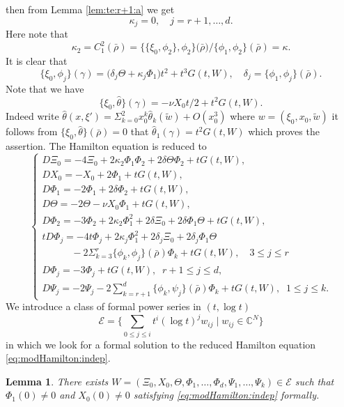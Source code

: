 \documentclass[12pt,leqno]{article} %
\def\ga{\gamma}
\def\C{{\mathbb C}}
\def\bro{\bar\rho}
\def\C{\mathbb{C}}
\def\bro{\bar\rho}
\numberwithin{equation}{section}
\newtheorem{lem}{Lemma}[section]
\begin{document}
then from Lemma \ref{lem:te:r+1:a} we get
%
\begin{equation}
\label{eq:yakobi:2:bis}
\kappa_j=0,\quad j=r+1,\ldots,d.
\end{equation}
%
Here note that 
%
\begin{equation}
\label{eq:kazehiki}
\kappa_2=C_1^2({\bar\rho})=\{\{\xi_0,\phi_2\},\phi_2\}({\bar\rho)}/\{\phi_1,\phi_2\}({\bar\rho})
=\kappa.
\end{equation}
%
It is clear that
%
\begin{equation}
\label{eq:sesu:bb}
\{\xi_0,\phi_j\}(\ga)=\big(\delta_j\Theta+\kappa_j\Phi_1\big)t^2+t^3G(t, W),\quad \delta_j=\{\phi_1,\phi_j\}(\bro).
\end{equation}
%
%
Note that we have 
%
\[
\{\xi_0,\hat\theta\}(\ga)=-\nu X_0t/2+t^2G(t,W).
\]
%
Indeed write $\hat\theta(x,\xi')=\Sigma_{k=0}^2x_0^k\hat\theta_k(\tilde w)+O(x_0^3)$ where $w=(\xi_0,x_0,\tilde w)$ it follows from $\{\xi_0,\hat\theta\}(\bro)=0$ that $\hat\theta_1(\ga)=t^2G(t,W)$ which proves the assertion. 
The Hamilton equation is reduced to
%
\begin{equation}
\label{eq:modHamilton:indep}
\left\{\begin{array}{llllll}
D\Xi_0=-4\Xi_0+2\kappa_2\Phi_1\Phi_2+2\delta \Theta\Phi_2+tG(t,W),\\[3pt]
DX_0=-X_0+2\Phi_1+tG(t, W),\\[3pt]
D\Phi_1=-2\Phi_1+2\delta \Phi_2+tG(t, W),\\[3pt]
D\Theta=-2\Theta-\nu X_0\Phi_1+tG(t, W),\\[3pt]
D\Phi_2=-3\Phi_2+2\kappa_2\Phi_1^2+2\delta \Xi_0+2\delta\Phi_1\Theta+tG(t, W),\\[3pt]
tD\Phi_j=-4t\Phi_j+2\kappa_j\Phi_1^2+2\delta_j\Xi_0+2\delta_j\Phi_1\Theta\\[3pt]
\quad\quad \quad -2\Sigma_{k=3}^r\{\phi_k,\phi_j\}(\bro)\Phi_k+tG(t, W),\quad 3\leq j\leq r\\[3pt]
D\Phi_j=-3\Phi_j+tG(t, W),\;\;r+1\leq j\leq d,\\[3pt]
D\Psi_j=-2\Psi_j-2\sum_{k=r+1}^d\{\phi_k,\psi_j\}({\bar\rho})\Phi_k+tG(t, W),\;\;1\leq j\leq k.
\end{array}\right.
\end{equation}
%
We introduce a class of formal power series in $(t, \log{t})$ 
%
\[
{\mathcal E}=\{\sum_{0\leq j\leq i}t^i(\log t)^jw_{ij}\mid w_{ij}\in \C^N\}
\]
%
in which we look for a formal solution to the reduced Hamilton equation \eqref{eq:modHamilton:indep}.
%
\begin{lem}
\label{lem:formal}
There exists  $W=(\Xi_0,X_0,\Theta, \Phi_1, \ldots,\Phi_d,\Psi_1,\ldots,\Psi_k)\in {\mathcal E}$ such that 
$\Phi_1(0)\neq 0$ and $X_0(0)\neq 0$ satisfying \eqref{eq:modHamilton:indep}  formally.
%
\end{lem}
\end{document}
